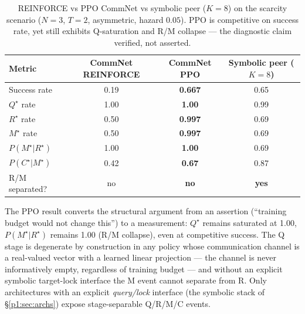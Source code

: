 \documentclass{article}
\begin{document}
\begin{table}[h]
\centering
\small
\caption{REINFORCE vs PPO CommNet vs symbolic peer ($K{=}8$) on the scarcity scenario ($N{=}3$, $T{=}2$, asymmetric, hazard $0.05$). PPO is competitive on success rate, yet still exhibits Q-saturation and R/M collapse --- the diagnostic claim verified, not asserted.}
\label{p1:tab:ppo-commnet}
\begin{tabular}{l c c c}
\toprule
Metric & CommNet REINFORCE & \textbf{CommNet PPO} & Symbolic peer ($K{=}8$) \\
\midrule
Success rate                  & 0.19   & \textbf{0.667} & 0.65 \\
$Q^\star$ rate                & 1.00   & \textbf{1.00}  & 0.99 \\
$R^\star$ rate                & 0.50   & \textbf{0.997} & 0.69 \\
$M^\star$ rate                & 0.50   & \textbf{0.997} & 0.69 \\
$P(M^\star|R^\star)$          & 1.00   & \textbf{1.00}  & 0.69 \\
$P(C^\star|M^\star)$          & 0.42   & \textbf{0.67}  & 0.87 \\
R/M separated?                & no     & \textbf{no}    & \textbf{yes} \\
\bottomrule
\end{tabular}
\end{table}

The PPO result converts the structural argument from an assertion (``training budget would not change this'') to a measurement: $Q^\star$ remains saturated at 1.00, $P(M^\star|R^\star)$ remains 1.00 (R/M collapse), even at competitive success. The Q stage is degenerate by construction in any policy whose communication channel is a real-valued vector with a learned linear projection --- the channel is never informatively empty, regardless of training budget --- and without an explicit symbolic target-lock interface the M event cannot separate from R. Only architectures with an explicit \emph{query/lock} interface (the symbolic stack of \S\ref{p1:sec:archs}) expose stage-separable Q/R/M/C events.
\end{document}
